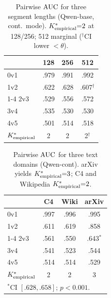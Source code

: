 \begin{table}[!htbp]
  \centering
  \small
  \caption{Pairwise $\text{AUC}$ for three segment lengths (Qwen-base, cont.\ mode). ${K^*_{\text{empirical}}}{=}2$ at 128/256; 512 marginal ($^\dagger$CI lower $< \theta$).}
  \label{tab:s11_length_ablation}
  \begin{tabular}{lccc}
    \toprule
    & \textbf{128} & \textbf{256} & \textbf{512} \\
    \midrule
    0v1 & .979 & .991 & .992 \\
    1v2 & .622 & .628 & .607$^\dagger$ \\
    \cmidrule(lr){1-4}
    2v3 & .529 & .556 & .572 \\
    3v4 & .535 & .530 & .530 \\
    4v5 & .501 & .514 & .518 \\
    \midrule
    ${K^*_{\text{empirical}}}$ & 2 & 2 & 2$^\dagger$ \\
    \bottomrule
  \end{tabular}
\end{table}

\begin{table}[!htbp]
  \centering
  \small
  \caption{Pairwise $\text{AUC}$ for three text domains (Qwen-cont). arXiv yields ${K^*_{\text{empirical}}}{=}3$; C4 and Wikipedia ${K^*_{\text{empirical}}}{=}2$.}
  \label{tab:s12_domain_ablation}
  \begin{tabular}{lccc}
    \toprule
    & \textbf{C4} & \textbf{Wiki} & \textbf{arXiv} \\
    \midrule
    0v1 & .997 & .996 & .995 \\
    1v2 & .611 & .619 & .858 \\
    \cmidrule(lr){1-4}
    2v3 & .561 & .550 & .643$^*$ \\
    3v4 & .541 & .523 & .544 \\
    4v5 & .514 & .514 & .529 \\
    \midrule
    ${K^*_{\text{empirical}}}$ & 2 & 2 & 3 \\
    \bottomrule
    \multicolumn{4}{l}{\footnotesize $^*$CI $[.628,.658]$; $p < 0.001$.}
  \end{tabular}
\end{table}

